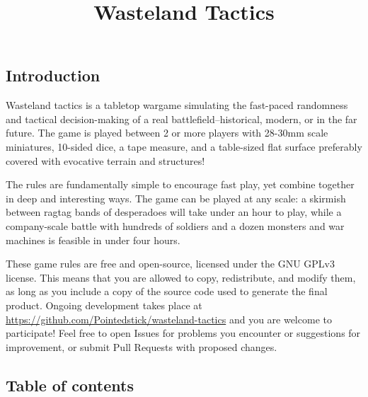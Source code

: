 






\title{Wasteland Tactics}

\begin{titlepage}
\maketitle
\end{titlepage}

\begin{multicols}{2}




\backmatter

\chapter{Introduction}
Wasteland tactics is a tabletop wargame simulating the fast-paced randomness and tactical decision-making of a real battlefield--historical, modern, or in the far future. The game is played between 2 or more players with 28-30mm scale miniatures, 10-sided dice, a tape measure, and a table-sized flat surface preferably covered with evocative terrain and structures!

The rules are fundamentally simple to encourage fast play, yet combine together in deep and interesting ways. The game can be played at any scale: a skirmish between ragtag bands of desperadoes will take under an hour to play, while a company-scale battle with hundreds of soldiers and a dozen monsters and war machines is feasible in under four hours.

These game rules are free and open-source, licensed under the GNU GPLv3 license. This means that you are allowed to copy, redistribute, and modify them, as long as you include a copy of the source code used to generate the final product. Ongoing development takes place at \url{https://github.com/Pointedstick/wasteland-tactics} and you are welcome to participate! Feel free to open Issues for problems you encounter or suggestions for improvement, or submit Pull Requests with proposed changes.


\vfill\null
\columnbreak

\section*{Table of contents}


\end{multicols}
